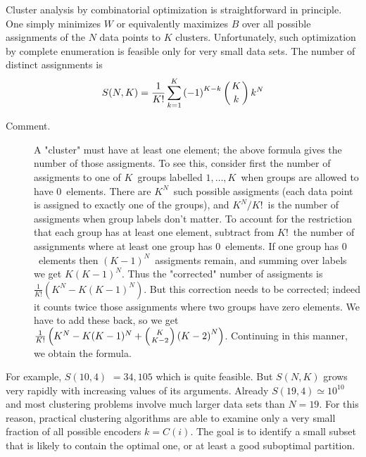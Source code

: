 \documentclass[11pt,twoside]{article}%
\theoremstyle{change}
\begin{document}
Cluster analysis by combinatorial optimization is straightforward in
principle. One simply minimizes $W$ or equivalently maximizes $B$ over all
possible assignments of the $N$ data points to $K$ clusters. Unfortunately,
such optimization by complete enumeration is feasible only for very small data
sets. The number of distinct assignments is
\[
S(N,K)=\frac{1}{K!}\sum_{k=1}^{K}\left(  -1\right)  ^{K-k}\left(
\genfrac{}{}{0pt}{}{K}{k}%
\right)  k^{N}%
\]


\begin{description}
\item[Comment.] {\small A "cluster" must have at least one element;}
{\small the above formula gives the number of those assigments. To see this,
consider first the number of assigments to one of }$K${\small \ groups
labelled }$1,\ldots,K${\small \ when groups are allowed to have }%
$0${\small \ elements. There are }$K^{N}${\small \ such possible assigments
(each data point is assigned to exactly one of the groups), and }$K^{N}%
/K!${\small \ is the number of assigments when group labels don't matter. To
account for the restriction that each group has at least one element, subtract
from }$K!${\small \ the number of assignments where at least one group has
}$0${\small \ elements. If one group has }$0${\small \ elements then
}$(K-1)^{N}${\small \ assigments remain, and summing over labels we get
}$K(K-1)^{N}${\small . Thus the "corrected" number of assigments is }$\frac
{1}{K!}\left(  K^{N}-K(K-1)^{N}\right)  ${\small . But this correction needs
to be corrected; indeed it counts twice those assignments where two groups
have zero elements. We have to add these back, so we get }$\frac{1}{K!}\left(
K^{N}-K(K-1)^{N}+\left(
\genfrac{}{}{0pt}{}{K}{K-2}%
\right)  \left(  K-2\right)  ^{N}\right)  ${\small . Continuing in this
manner, we obtain the formula.}
\end{description}

For example, $S(10,4)$ $=34,105$ which is quite feasible. But $S(N,K)$ grows
very rapidly with increasing values of its arguments. Already $S(19,4)\simeq
10^{10}$ and most clustering problems involve much larger data sets than
$N=19$. For this reason, practical clustering algorithms are able to examine
only a very small fraction of all possible encoders $k=C(i)$. The goal is to
identify a small subset that is likely to contain the optimal one, or at least
a good suboptimal partition.
\end{document}

